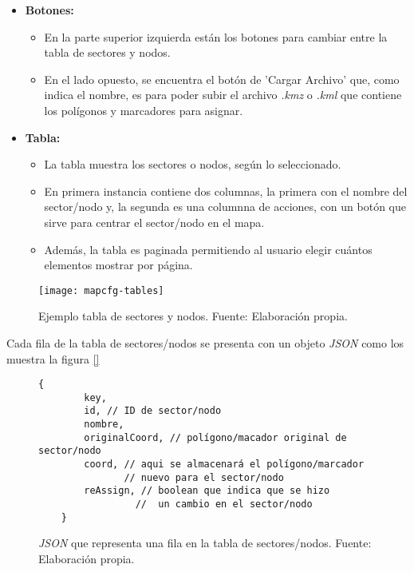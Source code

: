 \begin{itemize}
    \item \textbf{Botones:}
          \begin{itemize}
              \item En la parte superior izquierda están los botones para cambiar entre la tabla de sectores y nodos.
              \item En el lado opuesto, se encuentra el botón de 'Cargar Archivo' que, como indica el nombre, es para poder subir el archivo \textit{.kmz} o \textit{.kml} que contiene los polígonos y marcadores para asignar.
          \end{itemize}
    \item \textbf{Tabla:}  
    \begin{itemize}
        \item La tabla muestra los sectores o nodos, según lo seleccionado.
        \item En primera instancia contiene dos columnas, la primera con el nombre del sector/nodo y, la segunda es una columnna de acciones, con un botón que sirve para centrar el sector/nodo en el mapa. 
        \item Además, la tabla es paginada permitiendo al usuario elegir cuántos elementos mostrar por página.
    \end{itemize}
\end{itemize}

\begin{figure}[H]
	\centering
	\texttt{[image: mapcfg-tables]}
	\caption{\label{fig:mapcfg-tables-exameple} Ejemplo tabla de sectores y nodos. Fuente: Elaboración propia.}
\end{figure}

Cada fila de la tabla de sectores/nodos se presenta con un objeto \textit{JSON} como los muestra la figura \ref{}
\begin{figure}[H]
    \centering
    \begin{lstlisting}[frame=single, basicstyle=\ttfamily\small]
    {
        key,
        id, // ID de sector/nodo
        nombre,
        originalCoord, // polígono/macador original de sector/nodo
        coord, // aqui se almacenará el polígono/marcador 
               // nuevo para el sector/nodo
        reAssign, // boolean que indica que se hizo 
                 //  un cambio en el sector/nodo
    }     
    \end{lstlisting}
    \caption{\textit{JSON} que representa una fila en la tabla de sectores/nodos. Fuente: Elaboración propia.}
    \label{fig:ejemplo-mapa-json}
\end{figure}

